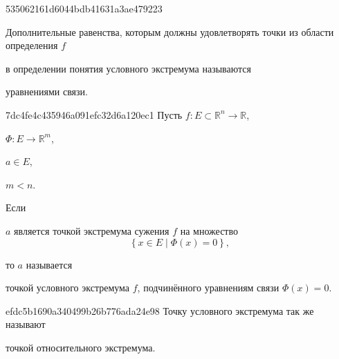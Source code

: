 \begin{note}{535062161d6044bdb41631a3ae479223}
    \begin{icloze}{2}Дополнительные равенства, которым должны удовлетворять точки из области определения \({ f }\)\end{icloze} в определении понятия условного экстремума называются \begin{icloze}{1}уравнениями связи.\end{icloze}
\end{note}

\begin{note}{7dc4fe4c435946a091efc32d6a120ec1}
    Пусть \({ f : E \subset \mathbb R^{n} \to \mathbb R }\), \begin{icloze}{4}\({ \Phi : E \to \mathbb R^{m} }\),\end{icloze} \({ a \in E }\), \begin{icloze}{3}\({ m < n }\).\end{icloze}
    Если
    \begin{icloze}{1}
        \({ a }\) является точкой экстремума сужения \({ f }\) на множество
        \[
            \left\{ x \in E \mid \Phi(x) = 0 \right\},
        \]
    \end{icloze}
    то \({ a }\) называется \begin{icloze}{2}точкой условного экстремума \({ f }\), подчинённого уравнениям связи \({ \Phi(x) = 0 }\).\end{icloze}
\end{note}

\begin{note}{efdc5b1690a340499b26b776ada24e98}
    Точку условного экстремума так же называют \begin{icloze}{1}точкой относительного экстремума.\end{icloze}
\end{note}


